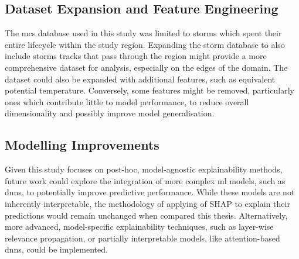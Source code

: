 \subsection{Dataset Expansion and Feature Engineering}

The \acrshort{mcs} database used in this study was limited to storms which spent their entire lifecycle within the study region. Expanding the storm database to also include storms tracks that pass through the region might provide a more comprehensive dataset for analysis, especially on the edges of the domain. The dataset could also be expanded with additional features, such as equivalent potential temperature. Conversely, some features might be removed, particularly ones which contribute little to model performance, to reduce overall dimensionality and possibly improve model generalisation.

\subsection{Modelling Improvements}

Given this study focuses on post-hoc, model-agnostic explainability methods, future work could explore the integration of more complex \acrshort{ml} models, such as \acrfull{dnn}s, to potentially improve predictive performance. While these models are not inherently interpretable, the methodology of applying of SHAP to explain their predictions would remain unchanged when compared this thesis. Alternatively, more advanced, model-specific explainability techniques, such as layer-wise relevance propagation, or partially interpretable models, like attention-based \acrfull{dnn}s, could be implemented.